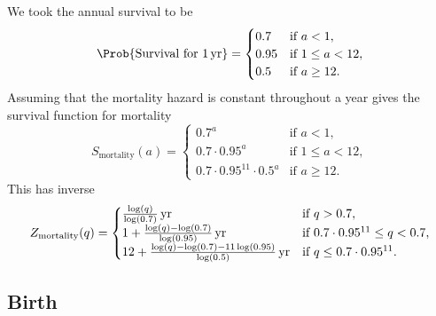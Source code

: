 \documentclass{jpmarticle}
\begin{document}
We took the annual survival to be
\begin{equation}
  \Prob\{\text{Survival for $\unit[1]{yr}$}\}
  =
  \begin{cases}
    0.7 & \text{if $a < 1$},
    \\
    0.95 & \text{if $1 \leq a < 12$},
    \\
    0.5 & \text{if $a \geq 12$}.
  \end{cases}
\end{equation}
Assuming that the mortality hazard is constant throughout a year gives
the survival function for mortality
\begin{equation}
  S_{\text{mortality}}(a) =
  \begin{cases}
    0.7^a & \text{if $a < 1$},
    \\
    0.7 \cdot 0.95^a & \text{if $1 \leq a < 12$},
    \\
    0.7 \cdot 0.95^{11} \cdot 0.5^a & \text{if $a \geq 12$}.
  \end{cases}
\end{equation}
This has inverse
\begin{equation}
  Z_{\text{mortality}}(q) =
  \begin{cases}
    \unit[\frac{\log(q)}{\log(0.7)}]{yr} & \text{if $q > 0.7$},
    \\
    \unit[1 + \frac{\log(q) - \log(0.7)}{\log(0.95)}]{yr}
    & \text{if $0.7 \cdot 0.95^{11} \leq q < 0.7$},
    \\
    \unit[12 + \frac{\log(q) - \log(0.7) - 11 \log(0.95)}{\log(0.5)}]{yr}
    & \text{if $q \leq 0.7 \cdot 0.95^{11}$}.
  \end{cases}
\end{equation}


\subsection{Birth}
\end{document}
